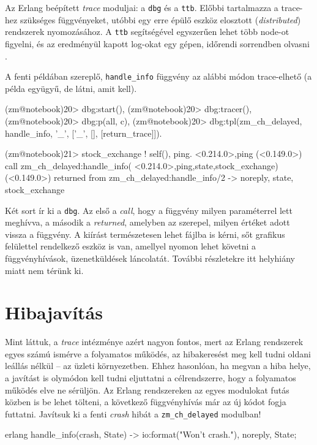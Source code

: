 \documentclass[12pt, a4paper, oneside]{book}
\begin{document}
Az Erlang beépített \emph{trace} moduljai: a \texttt{dbg} és a \texttt{ttb}.
Előbbi tartalmazza a trace-hez szükséges függvényeket, utóbbi egy erre épülő
eszköz elosztott (\emph{distributed}) rendszerek nyomozásához. A \texttt{ttb}
segítségével egyszerűen lehet több node-ot figyelni, és az eredményül kapott
log-okat egy gépen, időrendi sorrendben olvasni \citep{ErlangDoc}.

A fenti példában szereplő, \texttt{handle\_info} függvény
az alábbi módon trace-elhető (a példa együgyű, de látni, amit kell).

\begin{code}{}{}
(zm@notebook)20> dbg:start(),
(zm@notebook)20> dbg:tracer(),
(zm@notebook)20> dbg:p(all, c),
(zm@notebook)20> dbg:tpl(zm_ch_delayed, handle_info, '_', 
                  [{'_', [], [{return_trace}]}]).

(zm@notebook)21> stock_exchange ! {self(), ping}.
{<0.214.0>,ping}
(<0.149.0>) call zm_ch_delayed:handle_info(
                 {<0.214.0>,ping},{state,stock_exchange})
(<0.149.0>) returned from zm_ch_delayed:handle_info/2 -> 
                 {noreply, {state, stock_exchange}}
\end{code}

Két sort ír ki a \texttt{dbg}. Az első a \emph{call}, hogy a függvény milyen
paraméterrel lett meghívva, a második a \emph{returned}, amelyben az szerepel,
milyen értéket adott vissza a függvény. A kiírást természetesen lehet fájlba is
kérni, sőt grafikus felülettel rendelkező eszköz is van, amellyel nyomon lehet
követni a függvényhívások, üzenetküldések láncolatát. További részletekre itt
helyhiány miatt nem térünk ki.

\section{Hibajavítás}
Mint láttuk, a \emph{trace} intézménye azért nagyon fontos, mert az
Erlang rendszerek egyes számú ismérve a folyamatos működés, az hibakeresést meg
kell tudni oldani leállás nélkül -- az üzleti környezetben. Ehhez hasonlóan, ha
megvan a hiba helye, a javítást is olymódon kell tudni eljuttatni a
célrendszerre, hogy a folyamatos működés elve ne sérüljön. Az Erlang
rendszereken az egyes modulokat futás közben is be lehet tölteni, a következő
függvényhívás már az új kódot fogja futtatni. Javítsuk ki a fenti \emph{crash}
hibát a \texttt{zm\_ch\_delayed} modulban!

\begin{code}{erlang}{}
handle_info(crash, State) ->
  io:format("Won't crash.\n"),
  {noreply, State};
\end{code} 
\end{document}
